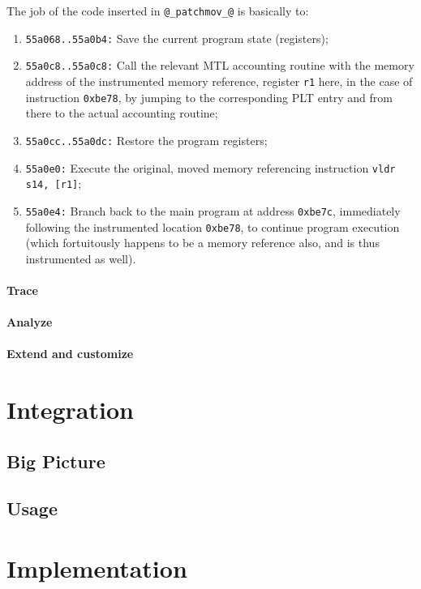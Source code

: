 \documentclass[11pt, a4paper, twoside]{montblanc2}
\begin{document}
The job of the code inserted in \verb|@_patchmov_@| is basically to:
\begin{enumerate}
\item \texttt{55a068..55a0b4:} Save the current program state (registers);
\item \texttt{55a0c8..55a0c8:} Call the relevant MTL accounting routine with the 
memory address of the instrumented memory reference, register \texttt{r1} here, 
in the case of instruction \texttt{0xbe78}, by jumping to the corresponding PLT 
entry and from there to the actual accounting routine;
\item \texttt{55a0cc..55a0dc:} Restore the program registers;
\item \texttt{55a0e0:} Execute the original, moved memory referencing 
instruction \verb|vldr s14, [r1]|;
\item \texttt{55a0e4:} Branch back to the main program at address 
  \texttt{0xbe7c}, immediately following the instrumented location 
  \texttt{0xbe78}, to continue program execution (which fortuitously happens to 
  be a memory reference also, and is thus instrumented as well).
\end{enumerate}

\paragraph{Trace}

\paragraph{Analyze}

\paragraph{Extend and customize}

\section{Integration}

  \subsection{Big Picture}
  \subsection{Usage}

\section{Implementation}
\end{document}
